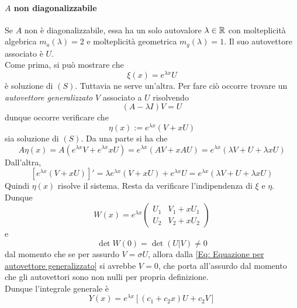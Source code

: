 \paragraph{$A$ non diagonalizzabile}
Se $A$ non è diagonalizzabile, essa ha un solo autovalore $\lambda \in \mathbb{R}$ con molteplicità algebrica $m_a(\lambda)=2$ e molteplicità geometrica $m_g(\lambda)=1$. Il suo autovettore associato è $U$.\\
Come prima, si può mostrare che 
\begin{equation*}
    \xi(x)=e^{\lambda x}U
\end{equation*}
è soluzione di $(S)$. Tuttavia ne serve un'altra. Per fare ciò occorre trovare un \textit{autovettore generalizzato} $V$ associato a $U$ risolvendo
\begin{equation} \label{Eq: Equazione per autovettore generalizzato}
    (A-\lambda I)V=U
\end{equation}
dunque occorre verificare che 
\begin{equation*}
    \eta(x):= e^{\lambda x}(V+xU)
\end{equation*}
sia soluzione di $(S)$. Da una parte si ha che
\begin{equation*}
    A \eta(x)= A(e^{\lambda x}V+e^{\lambda x}xU) = e^{\lambda x}(AV+ xAU)= e^{\lambda x}(\lambda V + U + \lambda x U)
\end{equation*}
Dall'altra, 
\begin{equation*}
    \left[e^{\lambda x}(V+xU)\right]'= \lambda
    e^{\lambda x}(V+xU) + e^{\lambda x}U = e^{\lambda x}(\lambda V + U + \lambda x U)
\end{equation*}
Quindi $\eta(x)$ risolve il sistema. Resta da verificare l'indipendenza di $\xi$ e $\eta$. Dunque 
\begin{equation*}
    W(x)= e^{\lambda x} \begin{pmatrix}
        U_1 & V_1 + x U_1\\
        U_2 & V_2 + x U_2
    \end{pmatrix}
\end{equation*}
e 
\begin{equation*}
    \det W(0) = \det(U | V) \neq 0
\end{equation*}
dal momento che se per assurdo $V= \sigma U$, allora dalla \eqref{Eq: Equazione per autovettore generalizzato} si avrebbe $V=0$, che porta all'assurdo dal momento che gli autovettori sono non nulli per propria definizione.\\
Dunque l'integrale generale è 
\begin{equation*}
    Y(x)= e^{\lambda x}[(c_1+c_2x)U+ c_2V]
\end{equation*}
